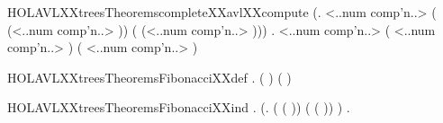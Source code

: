 \newcommand{\HOLAVLXXtreesTheoremschildrenXXofXXminimalXXavl}{\UseVerbatim{HOLAVLXXtreesTheoremschildrenXXofXXminimalXXavl}}
\begin{SaveVerbatim}{HOLAVLXXtreesTheoremscompleteXXavlXXcompute}
\HOLTokenTurnstile{}   \HOLSymConst{=}  \HOLSymConst{\HOLTokenConj{}}
   (\HOLSymConst{\HOLTokenForall{}}.  <..num comp'n..> \HOLSymConst{=}
            ( (<..num comp'n..> \HOLSymConst{\ensuremath{-}} ))
          ( (<..num comp'n..> \HOLSymConst{\ensuremath{-}} ))) \HOLSymConst{\HOLTokenConj{}}
   \HOLSymConst{\HOLTokenForall{}}.  <..num comp'n..> \HOLSymConst{=}
           ( <..num comp'n..> )
         ( <..num comp'n..> )
\end{SaveVerbatim}
\newcommand{\HOLAVLXXtreesTheoremscompleteXXavlXXcompute}{\UseVerbatim{HOLAVLXXtreesTheoremscompleteXXavlXXcompute}}
\begin{SaveVerbatim}{HOLAVLXXtreesTheoremsFibonacciXXdef}
\HOLTokenTurnstile{} \HOLSymConst{\HOLTokenForall{}}.   \HOLSymConst{=}
         \HOLSymConst{=}   
          \HOLSymConst{=}   
         ( \HOLSymConst{\ensuremath{-}} ) \HOLSymConst{\ensuremath{+}}  ( \HOLSymConst{\ensuremath{-}} )
\end{SaveVerbatim}
\newcommand{\HOLAVLXXtreesTheoremsFibonacciXXdef}{\UseVerbatim{HOLAVLXXtreesTheoremsFibonacciXXdef}}
\begin{SaveVerbatim}{HOLAVLXXtreesTheoremsFibonacciXXind}
\HOLTokenTurnstile{} \HOLSymConst{\HOLTokenForall{}}. (\HOLSymConst{\HOLTokenForall{}}. ( \HOLSymConst{\HOLTokenNotEqual{}}  \HOLSymConst{\HOLTokenConj{}}  \HOLSymConst{\HOLTokenNotEqual{}}  \HOLSymConst{\HOLTokenImp{}}  ( \HOLSymConst{\ensuremath{-}} )) \HOLSymConst{\HOLTokenConj{}}
            ( \HOLSymConst{\HOLTokenNotEqual{}}  \HOLSymConst{\HOLTokenConj{}}  \HOLSymConst{\HOLTokenNotEqual{}}  \HOLSymConst{\HOLTokenImp{}}  ( \HOLSymConst{\ensuremath{-}} )) \HOLSymConst{\HOLTokenImp{}}
             ) \HOLSymConst{\HOLTokenImp{}}
       \HOLSymConst{\HOLTokenForall{}}.  
\end{SaveVerbatim}
